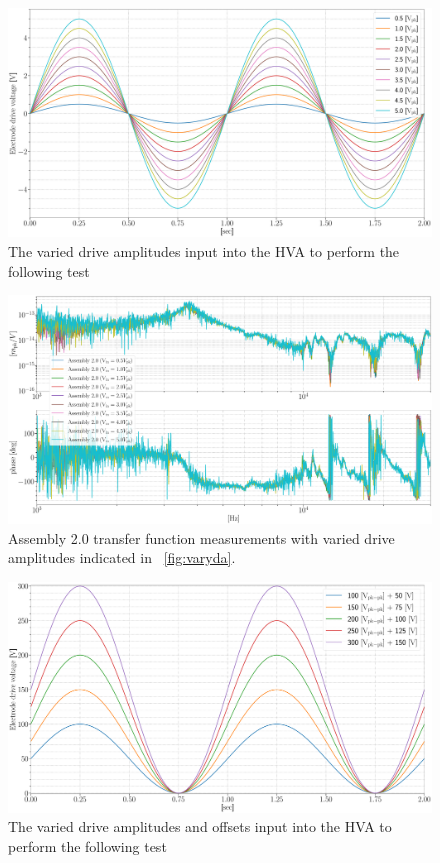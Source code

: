 \begin{figure}[H]
    \includegraphics[width=\textwidth]{figs/ALGAAS/results_figs/assembly2/vary_da.pdf}
    \caption{The varied drive amplitudes input into the HVA to perform the following test}
    \label{fig:varyda}
\end{figure}

\begin{figure}[H]
    \includegraphics[width=\textwidth]{figs/ALGAAS/results_figs/assembly2/vv53.pdf} 
    \caption{Assembly 2.0 transfer function measurements with varied drive amplitudes indicated in ~\autoref{fig:varyda}.}
    \label{fig:vv53}
\end{figure}


\begin{figure}[H]
    \includegraphics[width=\textwidth]{figs/ALGAAS/results_figs/assembly2/vary_daao.pdf}
    \caption{The varied drive amplitudes and offsets input into the HVA to perform the following test}
    \label{fig:varydaao}
\end{figure}


